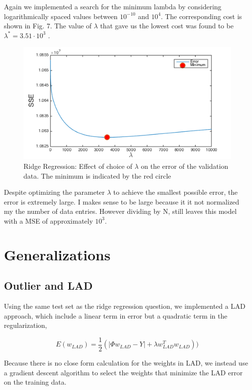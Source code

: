 \documentclass[10pt,twocolumn]{article}
\begin{document}
Again we implemented a search for the minimum lambda by considering logarithmically spaced values between $10^{-10}$ and $10^4$. The corresponding cost is shown in Fig. 7. The value of $\lambda $ that gave us the lowest cost was found to be $\lambda ^* = 3.51 \cdot 10^3 $ . 
\begin{figure}[H]
\center
\includegraphics[scale =.4]{3_3.png}
\caption{Ridge Regression: Effect of choice of $\lambda$ on the error of the validation data.  The minimum is indicated by the red circle}
\end{figure}


Despite optimizing the parameter $\lambda$ to achieve the smallest possible error,  the error is extremely large. I makes sense to be large because it it not normalized my the number of data entries. However dividing by N, still leaves this model with a MSE of approximately $10^3$. 

\section{Generalizations}
\subsection*{Outlier and LAD}

Using the same test set as the ridge regression question, we implemented a LAD approach, which include a linear term in error but a quadratic term in the regularization, 

\begin{equation}
E(w_{LAD}) = \frac{1}{2}(|\Phi w_{LAD}  -Y| + \lambda w_{LAD}^T w_{LAD}))
\end{equation}


Because there is no close form calculation for the weights in LAD, we instead use a gradient descent algorithm to select the weights that minimize the LAD error on the training data. 
\end{document}
